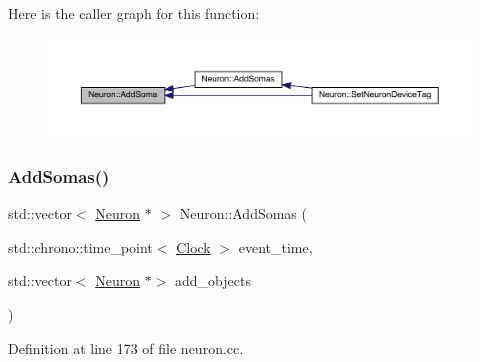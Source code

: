 Here is the caller graph for this function\+:
\nopagebreak
\begin{figure}[H]
\begin{center}
\leavevmode
\includegraphics[width=350pt]{class_neuron_a6198fa352056e3bbe1e979adf088b900_icgraph}
\end{center}
\end{figure}
\mbox{\label{class_neuron_a78a0f48a669b6ea20280829304e51de2}} 
\subsubsection{\texorpdfstring{Add\+Somas()}{AddSomas()}}
{\footnotesize\ttfamily std\+::vector$<$ \hyperlink{class_neuron}{Neuron} $\ast$ $>$ Neuron\+::\+Add\+Somas (\begin{DoxyParamCaption}\item[{std\+::chrono\+::time\+\_\+point$<$ \hyperlink{universe_8h_a0ef8d951d1ca5ab3cfaf7ab4c7a6fd80}{Clock} $>$}]{event\+\_\+time,  }\item[{std\+::vector$<$ \hyperlink{class_neuron}{Neuron} $\ast$$>$}]{add\+\_\+objects }\end{DoxyParamCaption})}



Definition at line 173 of file neuron.\+cc.

